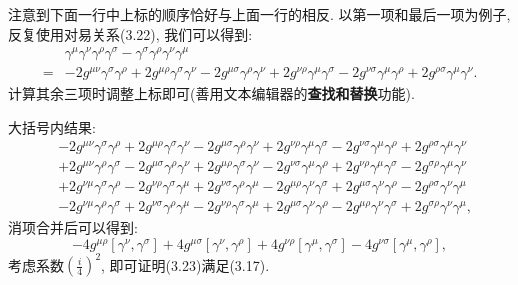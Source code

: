 注意到下面一行中上标的顺序恰好与上面一行的相反.
以第一项和最后一项为例子, 反复使用对易关系(3.22), 我们可以得到:
\begin{equation}
  \begin{aligned}
      & \gamma^\mu \gamma^\nu \gamma^\rho \gamma^\sigma - \gamma^\sigma \gamma^\rho \gamma^\nu \gamma^\mu                                                                                                                                          \\
    = & - 2g^{\mu\nu}\gamma^\sigma \gamma^\rho + 2g^{\mu\rho}\gamma^\sigma \gamma^\nu - 2g^{\mu\sigma}\gamma^\rho \gamma^\nu + 2g^{\nu\rho}\gamma^\mu \gamma^\sigma - 2g^{\nu\sigma}\gamma^\mu \gamma^\rho + 2g^{\rho\sigma}\gamma^\mu \gamma^\nu.
  \end{aligned}
\end{equation}
计算其余三项时调整上标即可(善用文本编辑器的\textbf{查找和替换}功能).

大括号内结果:
\begin{equation}
  \begin{aligned}
     & - 2g^{\mu\nu}\gamma^\sigma \gamma^\rho + 2g^{\mu\rho}\gamma^\sigma \gamma^\nu - 2g^{\mu\sigma}\gamma^\rho \gamma^\nu + 2g^{\nu\rho}\gamma^\mu \gamma^\sigma - 2g^{\nu\sigma}\gamma^\mu \gamma^\rho + 2g^{\rho\sigma}\gamma^\mu \gamma^\nu  \\
     & + 2g^{\mu\nu}\gamma^\rho \gamma^\sigma - 2g^{\mu\sigma}\gamma^\rho \gamma^\nu + 2g^{\mu\rho}\gamma^\sigma \gamma^\nu - 2g^{\nu\sigma}\gamma^\mu \gamma^\rho + 2g^{\nu\rho}\gamma^\mu \gamma^\sigma - 2g^{\sigma\rho}\gamma^\mu \gamma^\nu  \\
     & + 2g^{\nu\mu}\gamma^\sigma \gamma^\rho - 2g^{\nu\rho}\gamma^\sigma \gamma^\mu + 2g^{\nu\sigma}\gamma^\rho \gamma^\mu - 2g^{\mu\rho}\gamma^\nu \gamma^\sigma + 2g^{\mu\sigma}\gamma^\nu \gamma^\rho - 2g^{\rho\sigma}\gamma^\nu \gamma^\mu  \\
     & - 2g^{\nu\mu}\gamma^\rho \gamma^\sigma + 2g^{\nu\sigma}\gamma^\rho \gamma^\mu - 2g^{\nu\rho}\gamma^\sigma \gamma^\mu + 2g^{\mu\sigma}\gamma^\nu \gamma^\rho - 2g^{\mu\rho}\gamma^\nu \gamma^\sigma + 2g^{\sigma\rho}\gamma^\nu \gamma^\mu,
  \end{aligned}
\end{equation}
消项合并后可以得到:
\begin{equation}
  -4g^{\mu\rho}[\gamma^\nu, \gamma^\sigma] + 4g^{\mu\sigma}[\gamma^\nu, \gamma^\rho] + 4g^{\nu\rho}[\gamma^\mu, \gamma^\sigma] - 4g^{\nu\sigma}[\gamma^\mu, \gamma^\rho],
\end{equation}
考虑系数$(\frac{i}{4})^2$, 即可证明(3.23)满足(3.17).

